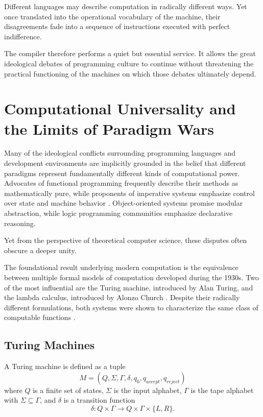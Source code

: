 \documentclass[11pt]{article}
\theoremstyle{definition}
\begin{document}
Different languages may describe computation in radically different
ways. Yet once translated into the operational vocabulary of the
machine, their disagreements fade into a sequence of instructions
executed with perfect indifference.

The compiler therefore performs a quiet but essential service. It
allows the great ideological debates of programming culture to continue
without threatening the practical functioning of the machines on which
those debates ultimately depend.

\section{Computational Universality and the Limits of Paradigm Wars}

Many of the ideological conflicts surrounding programming languages and
development environments are implicitly grounded in the belief that
different paradigms represent fundamentally different kinds of
computational power. Advocates of functional programming frequently
describe their methods as mathematically pure, while proponents of
imperative systems emphasize control over state and machine behavior
\cite{backus1978}. Object-oriented systems promise modular abstraction,
while logic programming communities emphasize declarative reasoning.

Yet from the perspective of theoretical computer science, these disputes
often obscure a deeper unity.

The foundational result underlying modern computation is the equivalence
between multiple formal models of computation developed during the
1930s. Two of the most influential are the Turing machine, introduced
by Alan Turing, and the lambda calculus, introduced by Alonzo Church
\cite{church1936,turing1936}. Despite their radically different
formulations, both systems were shown to characterize the same class
of computable functions \cite{kleene1952}.

\subsection{Turing Machines}

A Turing machine is defined as a tuple
\[
M = (Q, \Sigma, \Gamma, \delta, q_0, q_{accept}, q_{reject})
\]
where $Q$ is a finite set of states, $\Sigma$ is the input alphabet,
$\Gamma$ is the tape alphabet with $\Sigma \subseteq \Gamma$, and
$\delta$ is a transition function
\[
\delta : Q \times \Gamma \rightarrow Q \times \Gamma \times \{L,R\}.
\]
\end{document}
